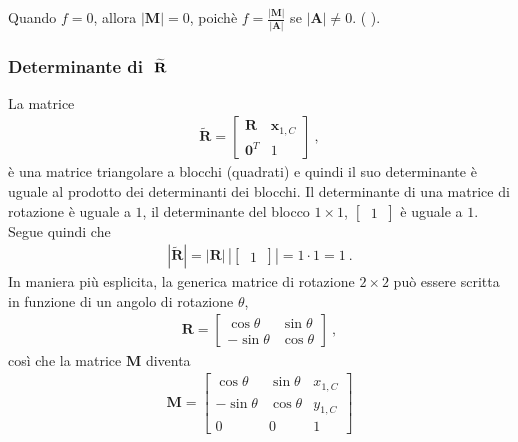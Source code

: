 \documentclass[letterpaper,10pt,italian]{jupyterBook}
\begin{document}
\sphinxAtStartPar
Quando \(f = 0\), allora \(| \mathbf{M} | = 0\), poichè \(f = \frac{|\mathbf{M}|}{|\mathbf{A}|}\) se \(|\mathbf{A}| \ne 0\). ( ).
\subsubsection*{Determinante di \protect\(\ \widetilde{\mathbf{R}}\protect\)}

\sphinxAtStartPar
La matrice
\begin{equation*}
\begin{split}\widetilde{\mathbf{R}} = \begin{bmatrix} \mathbf{R} & \mathbf{x}_{1,C} \\ \mathbf{0}^T & 1 \end{bmatrix} \ ,\end{split}
\end{equation*}
\sphinxAtStartPar
è una matrice triangolare a blocchi (quadrati) e quindi il suo determinante è uguale al prodotto dei determinanti dei blocchi. Il determinante di una matrice di rotazione è uguale a \(1\), il determinante del blocco \(1 \times 1\), \(\begin{bmatrix} \ 1 \  \end{bmatrix}\) è uguale a \(1\). Segue quindi che
\begin{equation*}
\begin{split}|\widetilde{\mathbf{R}}| = |\mathbf{R}| \, | \begin{bmatrix} \ 1 \ \end{bmatrix} | = 1 \cdot 1 = 1 \ .\end{split}
\end{equation*}
\sphinxAtStartPar
In maniera più esplicita, la generica matrice di rotazione \(2 \times 2\) può essere scritta in funzione di un angolo di rotazione \(\theta\),
\begin{equation*}
\begin{split}\mathbf{R} = \begin{bmatrix} \cos \theta & \sin \theta \\ -\sin \theta & \cos \theta \end{bmatrix} \ ,\end{split}
\end{equation*}
\sphinxAtStartPar
così che la matrice \(\mathbf{M}\) diventa
\begin{equation*}
\begin{split}\mathbf{M} = \begin{bmatrix} \cos \theta & \sin \theta & x_{1,C} \\ -\sin\theta & \cos \theta & y_{1,C} \\ 0 & 0 & 1 \end{bmatrix}\end{split}
\end{equation*}
\end{document}
